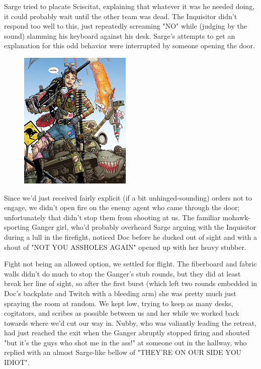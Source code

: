 Sarge tried to placate Sciscitat, explaining that whatever it was he needed doing, it could probably wait until the other team was dead. 
The Inquisitor didn't respond too well to this, just repeatedly screaming "NO" while (judging by the sound) slamming his keyboard against his desk. 
Sarge's attempts to get an explanation for this odd behavior were interrupted by someone opening the door. 


\begin{figure}
	\begin{center}
		\includegraphics[width=\figwidth]{pics/18/32.png}
	\end{center}
\end{figure}
Since we'd just received fairly explicit (if a bit unhinged-sounding) orders not to engage, we didn't open fire on the enemy agent who came through the door; 
unfortunately that didn't stop them from shooting at us. 
The familiar mohawk-sporting Ganger girl, who'd probably overheard Sarge arguing with the Inquisitor during a lull in the firefight, noticed Doc before he ducked out of sight and with a shout of "NOT YOU ASSHOLES AGAIN" opened up with her heavy stubber.

Fight not being an allowed option, we settled for flight. 
The fiberboard and fabric walls didn't do much to stop the Ganger's stub rounds, but they did at least break her line of sight, so after the first burst (which left two rounds embedded in Doc's backplate and Twitch with a bleeding arm) she was pretty much just spraying the room at random. 
We kept low, trying to keep as many desks, cogitators, and scribes as possible between us and her while we worked back towards where we'd cut our way in. 
Nubby, who was valiantly leading the retreat, had just reached the exit when the Ganger abruptly stopped firing and shouted "but it's the guys who shot me in the ass!" at someone out in the hallway, who replied with an almost Sarge-like bellow of "THEY'RE ON OUR SIDE YOU IDIOT".

